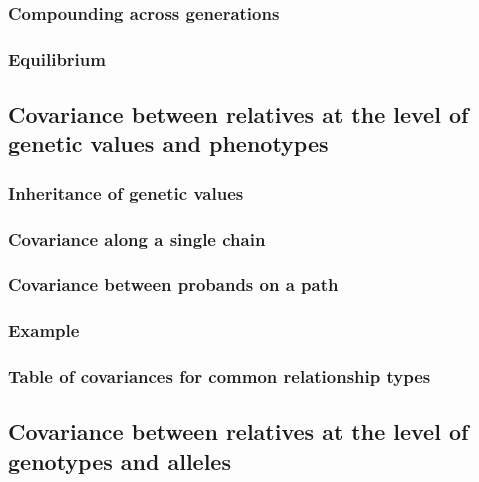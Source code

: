 \documentclass[12pt]{article}
\numberwithin{equation}{section}
\begin{document}
\subsubsection{Compounding across generations}\label{sec:am-compounding}

\subsubsection{Equilibrium}\label{sec:am-equilibrium}

\subsection{Covariance between relatives at the level of genetic values and phenotypes}\label{sec:am-rel-values}

\subsubsection{Inheritance of genetic values}\label{sec:am-g-inheritance}

\subsubsection{Covariance along a single chain}\label{sec:am-chain-cov}

\subsubsection{Covariance between probands on a path}\label{sec:am-probands}

\subsubsection{Example}\label{sec:am-example}

\subsubsection{Table of covariances for common relationship types}\label{sec:am-rel-table}

\subsection{Covariance between relatives at the level of genotypes and alleles}\label{sec:am-rel-geno}
\end{document}
